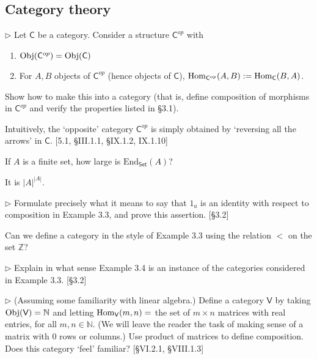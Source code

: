 \subsection{Category theory}


\begin{problem}
  $\rhd$ Let $\mathsf{C}$ be a category. Consider a structure
  $\mathsf{C}^{op}$ with
  \begin{enumerate}
    \item $\mathrm{Obj}(\mathsf{C}^{op}) = \mathrm{Obj}(\mathsf{C})$
    \item For $A, B$ objects of $\mathsf{C}^{op}$ (hence objects of
    $\mathsf{C}$), $\mathrm{Hom}_{\mathsf{C}^{op}}(A, B) := \mathrm{Hom}_{\mathsf{C}}(B, A)$.
  \end{enumerate}
  Show how to make this into a category (that is, define composition of
  morphisms in $\mathsf{C}^{op}$ and verify the properties listed in \S3.1).

  Intuitively, the `opposite' category $\mathsf{C}^{op}$ is simply obtained
  by `reversing all the arrows' in $\mathsf{C}$. [5.1, \S III.1.1, \S IX.1.2,
  IX.1.10]
\end{problem}

\begin{problem}
  If $A$ is a finite set, how large is $\mathrm{End}_{\mathsf{Set}}(A)$?
\end{problem}
\begin{solution}
  It is $|A|^{|A|}$.
\end{solution}

\begin{problem}
  $\rhd$ Formulate precisely what it means to say that $1_a$ is an identity
  with respect to composition in Example 3.3, and prove this assertion.
  [\S3.2]
\end{problem}

\begin{problem}
  Can we define a category in the style of Example 3.3 using the relation
  $<$ on the set $\mathbb{Z}$?
\end{problem}

\begin{problem}
  $\rhd$ Explain in what sense Example 3.4 is an instance of the categories
  considered in Example 3.3. [\S 3.2]
\end{problem}

\begin{problem}
  $\rhd$ (Assuming some familiarity with linear algebra.) Define a category
  $\mathsf{V}$ by taking $\mathrm{Obj}(\mathsf{V}) = \mathbb{N}$ and letting
  $\mathrm{Hom}_{\mathsf{V}}(m,n) = $ the set of $m\times n$ matrices with real
  entries, for all $m,n\in\mathbb{N}$. (We will leave the reader the task of
  making sense of a matrix with 0 rows or columns.) Use product of matrices
  to define composition. Does this category `feel' familiar?
  [\S VI.2.1, \S VIII.1.3]
\end{problem}

